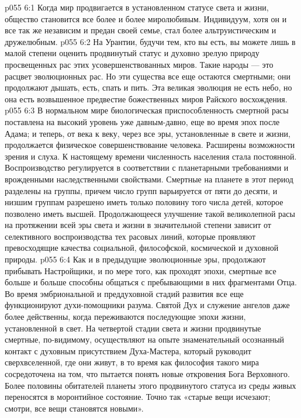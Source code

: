 \vs p055 6:1 Когда мир продвигается в установленном статусе света и жизни, общество становится все более и более миролюбивым. Индивидуум, хотя он и все так же независим и предан своей семье, стал более альтруистическим и дружелюбным.
\vs p055 6:2 На Урантии, будучи тем, кто вы есть, вы можете лишь в малой степени оценить продвинутый статус и духовно зрелую природу просвещенных рас этих усовершенствованных миров. Такие народы --- это расцвет эволюционных рас. Но эти существа все еще остаются смертными; они продолжают дышать, есть, спать и пить. Эта великая эволюция не есть небо, но она есть возвышенное предвестие божественных миров Райского восхождения.
\vs p055 6:3 В нормальном мире биологическая приспособленность смертной расы поставлена на высокий уровень уже давным\hyp{}давно, еще во время эпох после Адама; и теперь, от века к веку, через все эры, установленные в свете и жизни, продолжается физическое совершенствование человека. Расширены возможности зрения и слуха. К настоящему времени численность населения стала постоянной. Воспроизводство регулируется в соответствии с планетарными требованиями и врожденными наследственными свойствами. Смертные на планете в этот период разделены на группы, причем число групп варьируется от пяти до десяти, и низшим группам разрешено иметь только половину того числа детей, которое позволено иметь высшей. Продолжающееся улучшение такой великолепной расы на протяжении всей эры света и жизни в значительной степени зависит от селективного воспроизводства тех расовых линий, которые проявляют превосходящие качества социальной, философской, космической и духовной природы.
\vs p055 6:4 \pc Как и в предыдущие эволюционные эры, продолжают прибывать Настройщики, и по мере того, как проходят эпохи, смертные все больше и больше способны общаться с пребывающими в них фрагментами Отца. Во время эмбриональной и преддуховной стадий развития все еще функционируют духи\hyp{}помощники разума. Святой Дух и служение ангелов даже более действенны, когда переживаются последующие эпохи жизни, установленной в свет. На четвертой стадии света и жизни продвинутые смертные, по\hyp{}видимому, осуществляют на опыте знаменательный осознанный контакт с духовным присутствием Духа\hyp{}Мастера, который руководит сверхвселенной, где они живут, в то время как философия такого мира сосредоточена на том, что пытается понять новые откровения Бога Верховного. Более половины обитателей планеты этого продвинутого статуса из среды живых переносятся в моронтийное состояние. Точно так «старые вещи исчезают; смотри, все вещи становятся новыми».
